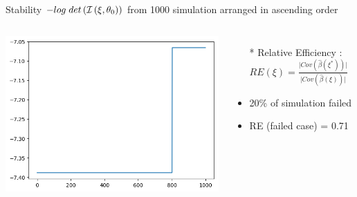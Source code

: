 \documentclass{beamer}
\begin{document}
\begin{frame}{Stability}
  $-log \hspace{1mm} det \left( \mathcal{I} \left( \xi,\theta_0 \right) \right)$ from 1000 simulation arranged in ascending order\\
  \begin{columns}
    \begin{center}
      \includegraphics[scale=0.5]{stability.png}
    \end{center}
    \begin{itemize}
      \item[*] Relative Efficiency : $RE(\xi) =  \frac{\lvert Cov(\hat{\beta}(\xi^*))\rvert}{\lvert Cov(\hat{\beta}(\xi))\rvert} $ 
      \item 20\% of simulation failed
      \item RE (failed case) = 0.71
    \end{itemize}
  \end{columns}
\end{frame}
\end{document}
